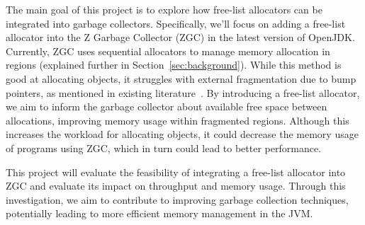 The main goal of this project is to explore how free-list allocators can be integrated into garbage collectors. Specifically, we'll focus on adding a free-list allocator into the Z Garbage Collector (ZGC) in the latest version of OpenJDK. Currently, ZGC uses sequential allocators to manage memory allocation in regions (explained further in Section~\ref{sec:background}). While this method is good at allocating objects, it struggles with external fragmentation due to bump pointers, as mentioned in existing literature~\cite{TODO:bump}. By introducing a free-list allocator, we aim to inform the garbage collector about available free space between allocations, improving memory usage within fragmented regions. Although this increases the workload for allocating objects, it could decrease the memory usage of programs using ZGC, which in turn could lead to better performance.

This project will evaluate the feasibility of integrating a free-list allocator into ZGC and evaluate its impact on throughput and memory usage. Through this investigation, we aim to contribute to improving garbage collection techniques, potentially leading to more efficient memory management in the JVM.
